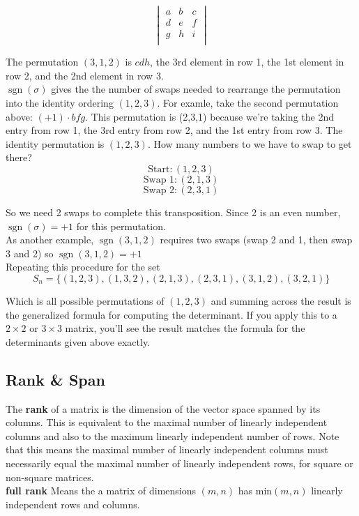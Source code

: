 \documentclass[12pt]{article}
\begin{document}
\[
\begin{vmatrix}
a & b & c \\
d & e & f \\
g & h & i \\
\end{vmatrix}
\]

The permutation \((3,1,2)\) is \(cdh\), the 3rd element in row 1, the 1st element in row 2, and the 2nd element in row 3.\\

\( \operatorname{sgn}(\sigma) \)  gives the the number of swaps needed to rearrange the permutation into the identity ordering \((1,2,3)\). For examle, take the second permutation above: \((+1) \cdot bfg\). This permutation is (2,3,1) because we're taking the 2nd entry from row 1, the 3rd entry from row 2, and the 1st entry from row 3. The identity permutation is \((1,2,3)\). How many numbers to we have to swap to get there? 
\[\text{Start}: (1,2,3)\]
\[\text{Swap 1}: (2,1,3)\]
\[\text{Swap 2}: (2,3,1)\]

So we need 2 swaps to complete this transposition. Since 2 is an even number, \( \operatorname{sgn}(\sigma)=+1\) for this permutation. \\ 

As another example,  \( \operatorname{sgn}(3,1,2)\) requires two swaps (swap 2 and 1, then swap 3 and 2) so \( \operatorname{sgn}(3,1,2)=+1\)\\

Repeating this procedure for the set 
\[S_n = \{(1, 2, 3), (1, 3, 2), (2, 1, 3), (2, 3, 1), (3, 1, 2), (3, 2, 1)\}\] 

Which is all possible permutations of \((1, 2, 3)\) and summing across the result is the generalized formula for computing the determinant. If you apply this to a \(2 \times 2\) or \(3 \times 3\) matrix, you'll see the result matches the formula for the determinants given above exactly.

\subsection{Rank \& Span}
The \textbf{rank} of a matrix is the dimension of the vector space spanned by its columns. This is equivalent to the maximal number of linearly independent columns and also to the maximum linearly independent number of rows. Note that this means the maximal number of linearly independent columns must necessarily equal the maximal number of linearly independent rows, for square or non-square matrices. \\
\textbf{full rank} Means the a matrix of dimensions \((m,n)\) has \(\text{min}(m,n)\) linearly independent rows and columns. 
\end{document}
